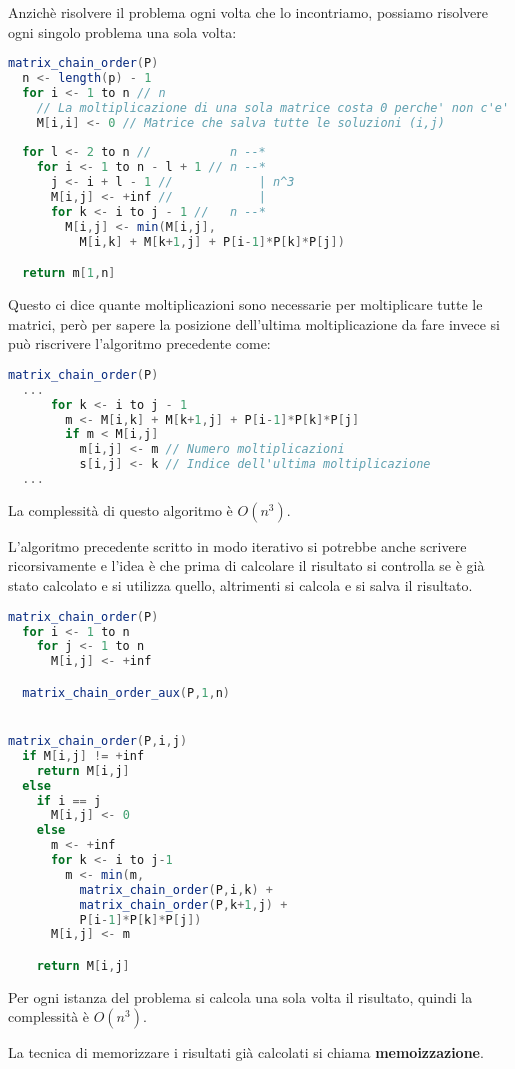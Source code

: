 \documentclass[a4paper]{article}
\begin{document}
Anzichè risolvere il problema ogni volta che lo incontriamo, possiamo risolvere ogni
singolo problema una sola volta:
\begin{lstlisting}[language=Scala]
matrix_chain_order(P)
  n <- length(p) - 1
  for i <- 1 to n // n
    // La moltiplicazione di una sola matrice costa 0 perche' non c'e' nulla da moltiplicare
    M[i,i] <- 0 // Matrice che salva tutte le soluzioni (i,j)
  
  for l <- 2 to n //           n --*
    for i <- 1 to n - l + 1 // n --*
      j <- i + l - 1 //            | n^3
      M[i,j] <- +inf //            |
      for k <- i to j - 1 //   n --*
        M[i,j] <- min(M[i,j],
          M[i,k] + M[k+1,j] + P[i-1]*P[k]*P[j])

  return m[1,n]
\end{lstlisting}
Questo ci dice quante moltiplicazioni sono necessarie per moltiplicare tutte le matrici,
però per sapere la posizione dell'ultima moltiplicazione da fare invece si può
riscrivere l'algoritmo precedente come:
\begin{lstlisting}[language=Scala]
matrix_chain_order(P)
  ...
      for k <- i to j - 1
        m <- M[i,k] + M[k+1,j] + P[i-1]*P[k]*P[j]
        if m < M[i,j]
          m[i,j] <- m // Numero moltiplicazioni
          s[i,j] <- k // Indice dell'ultima moltiplicazione
  ...
\end{lstlisting}
La complessità di questo algoritmo è \( O(n^3) \).

\vspace{1em}
\noindent
L'algoritmo precedente scritto in modo iterativo si potrebbe anche scrivere ricorsivamente
e l'idea è che prima di calcolare il risultato si controlla se è già stato calcolato
e si utilizza quello, altrimenti si calcola e si salva il risultato.
\begin{lstlisting}[language=Scala]
matrix_chain_order(P)
  for i <- 1 to n
    for j <- 1 to n
      M[i,j] <- +inf

  matrix_chain_order_aux(P,1,n)


matrix_chain_order(P,i,j)
  if M[i,j] != +inf
    return M[i,j]
  else
    if i == j
      M[i,j] <- 0
    else
      m <- +inf
      for k <- i to j-1
        m <- min(m,
          matrix_chain_order(P,i,k) +
          matrix_chain_order(P,k+1,j) +
          P[i-1]*P[k]*P[j])
      M[i,j] <- m

    return M[i,j]
\end{lstlisting}
Per ogni istanza del problema si calcola una sola volta il risultato, quindi la complessità
è \( O(n^3) \).

\vspace{1em}
\noindent
\begin{definition}
  La tecnica di memorizzare i risultati già calcolati si chiama \textbf{memoizzazione}.
\end{definition}
\end{document}
